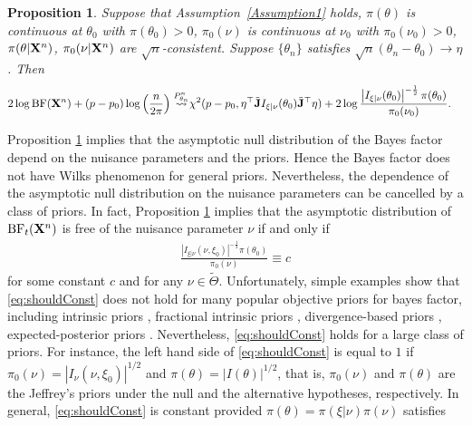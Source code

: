 \documentclass[11pt]{article}
\theoremstyle{plain}
\newtheorem{proposition}{\quad\quad Proposition}
\theoremstyle{definition}
\theoremstyle{remark}
\begin{document}
    \begin{proposition}
        Suppose that Assumption~\ref{Assumption1} holds, $\pi(\theta)$ is continuous at $\theta_0$ with $\pi(\theta_0)>0$, $\pi_0(\nu)$ is continuous at $\nu_0$ with $\pi_0(\nu_0)>0$, $\pi(\theta |\mathbf{X}^{n})$, $\pi_0(\nu|\mathbf{X}^{n})$ are $\sqrt{n}$-consistent.
        Suppose $\{\theta_n\}$ satisfies $\sqrt{n}(\theta_n-\theta_0)\to \eta$.
        Then 
\begin{align*}
    2 \log \textrm{BF} (\mathbf{X}^{n})
    +(p-p_0) \log \left( \frac{n}{2\pi} \right)
\overset{P^n_{\theta_n}}{\rightsquigarrow}
    &
    \chi^2 (p-p_0, \eta^\top\tilde {\mathbf{J}} I_{\xi|\nu}(\theta_0) \tilde{\mathbf{J}}^\top\eta )
    +
   2 \log
       \frac{
           \left|I_{\xi|\nu}(\theta_0)\right|^{-\frac 1 2}\pi(\theta_0) 
   }{
    \pi_0(\nu_0)
}
    .
\end{align*}
\label{prop:expansion}
    \end{proposition}
    Proposition \ref{prop:expansion} implies that the asymptotic null distribution of the Bayes factor depend on the nuisance parameters and the priors.
    Hence the Bayes factor does not have Wilks phenomenon for general priors.
Nevertheless, the dependence of the asymptotic null distribution on the nuisance parameters can be cancelled by a class of priors.
In fact, Proposition \ref{prop:expansion} implies that the asymptotic distribution of $\textrm{BF}_t (\mathbf{X}^n)$ is free of the nuisance parameter $\nu$ if and only if
\begin{align}\label{eq:shouldConst}
       \frac{
           \left|I_{\xi|\nu}(\nu, \xi_0)\right|^{-\frac 1 2}\pi(\theta_0) 
   }{
    \pi_0(\nu)
}
\equiv c
\end{align}
for some constant $c$ and for any $\nu \in \tilde \Theta$.
Unfortunately, simple examples show that \eqref{eq:shouldConst} does not hold for many popular objective priors for bayes factor, including intrinsic priors \citep{intrisicBayesFactor}, fractional intrinsic priors \citep{santis1997Alt}, divergence-based priors \citep{Bayarri2008Gen}, expected-posterior priors \citep{Perez2002}.
Nevertheless, \eqref{eq:shouldConst} holds for a large class of priors.
For instance, the left hand side of \eqref{eq:shouldConst} is equal to $1$ if $\pi_0(\nu) = |I_{\nu}(\nu, \xi_0)|^{1/2}$ and $\pi(\theta) = | I (\theta)|^{1/2}$, that is, $\pi_0(\nu)$ and $\pi(\theta)$ are the Jeffrey's priors under the null and the alternative hypotheses, respectively.
In general, \eqref{eq:shouldConst} is constant provided $\pi(\theta) = \pi (\xi |\nu) \pi(\nu)$ satisfies
\end{document}
